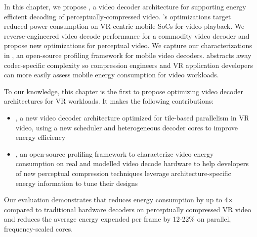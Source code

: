 In this chapter, we propose \nameArch, a video decoder architecture for supporting energy efficient decoding of perceptually-compressed video.
\nameArch's optimizations target reduced power consumption on VR-centric mobile SoCs for video playback.
We reverse-engineered video decode performance for a commodity video decoder and propose new optimizations for perceptual video.
We capture our characterizations in \nameArchprof, an open-source profiling framework for mobile video decoders.
\nameArchprof abstracts away codec-specific complexity so compression engineers and VR application developers can more easily assess mobile energy consumption for video workloads.

To our knowledge, this chapter is the first to propose optimizing video decoder architectures for VR workloads.
It makes the following contributions:
\begin{itemize}
    \item \nameArch, a new video decoder architecture optimized for tile-based parallelism in VR video, using a new scheduler and heterogeneous decoder cores to improve energy efficiency
    \item \nameArchprof, an open-source profiling framework to characterize video energy consumption on real and modelled video decode hardware to help developers of new perceptual compression techniques leverage architecture-specific energy information to tune their designs
\end{itemize}

Our evaluation demonstrates that \nameArch reduces energy consumption by up to 4$\times$ compared to traditional hardware decoders on perceptually compressed VR video and reduces the average energy expended per frame by 12-22\% on parallel, frequency-scaled cores.
